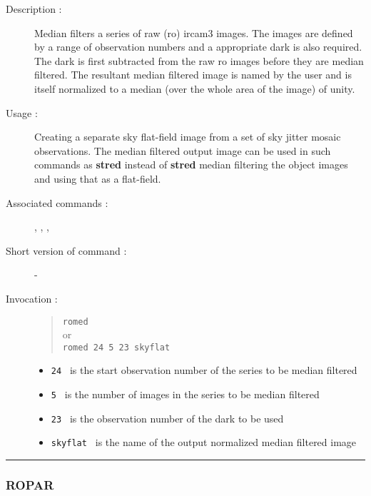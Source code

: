 \begin{description}

\item[Description :] Median filters a series of raw ({\sc ro}) {\sc
ircam3} images.  The images are defined by a range of observation
numbers and a appropriate dark is also required.  The dark is first
subtracted from the raw {\sc ro} images before they are median
filtered.  The resultant median filtered image is named by the user and
is itself normalized to a median (over the whole area of the image) of
unity.

\item[Usage :] Creating a separate
sky flat-field image from a set of sky jitter mosaic observations.  The
median filtered output image can be used in such commands as {\bf
stred} instead of {\bf stred} median filtering the object images and
using that as a flat-field.

\item[Associated commands :] {\tt {}}, 
{\tt {}}, {\tt {}}, 
{\tt {}}

\item[Short version of command :] -
\item[Invocation :]

\begin{quote}{\tt  romed }\\
or \\
{\tt romed 24 5 23 skyflat }
\end{quote}

\begin{itemize}

\item {\tt 24 } is the start observation number of the series to be
 median filtered
\item {\tt 5 } is the number of images in the series to be median
 filtered
\item {\tt 23 } is the observation number of the dark to be used
\item {\tt skyflat } is the name of the output normalized median
 filtered image
\end{itemize}

\end{description}

\hrule 
\subsubsection*{\label{ROPAR}ROPAR}

